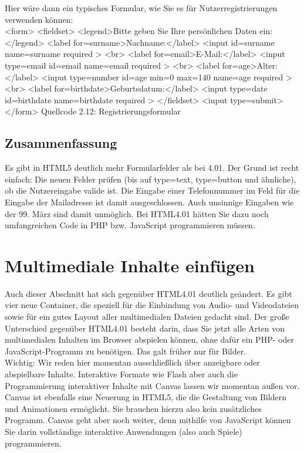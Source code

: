 Hier wäre dann ein typisches Formular, wie Sie es für Nutzerregistrierungen verwenden können:\\

<form>
<fieldset>
<legend>Bitte geben Sie Ihre persönlichen Daten ein:</legend>
<label for=surname>Nachname:</label>
<input id=surname name=surname required >
<br>
<label for=email>E-Mail:</label>
<input type=email id=email name=email required >
<br>
<label for=age>Alter:</label>
<input type=number id=age min=0 max=140 name=age required >
<br>
<label for=birthdate>Geburtsdatum:</label>
<input type=date id=birthdate name=birthdate required >
</fieldset>
<input type=submit>
</form>          
Quellcode 2.12: Registrierungsformular

\subsection{Zusammenfassung}

Es gibt in HTML5 deutlich mehr Formularfelder als bei 4.01. Der Grund ist recht einfach: Die neuen Felder prüfen (bis auf type=text, type=button und ähnliche), ob die Nutzereingabe valide ist. Die Eingabe einer Telefonnummer im Feld für die Eingabe der Mailadresse ist damit ausgeschlossen. Auch unsinnige Eingaben wie der 99. März sind damit unmöglich. Bei HTML4.01 hätten Sie dazu noch umfangreichen Code in PHP bzw. JavaScript programmieren müssen.

\section{Multimediale Inhalte einfügen}

Auch dieser Abschnitt hat sich gegenüber HTML4.01 deutlich geändert. Es gibt vier neue Container, die speziell für die Einbindung von Audio- und Videodateien sowie für ein gutes Layout aller multimedialen Dateien gedacht sind. Der große Unterschied gegenüber HTML4.01 besteht darin, dass Sie jetzt alle Arten von multimedialen Inhalten im Browser abspielen können, ohne dafür ein PHP- oder JavaScript-Programm zu benötigen. Das galt früher nur für Bilder.\\

Wichtig: Wir reden hier momentan ausschließlich über anzeigbare oder abspielbare Inhalte. Interaktive Formate wie Flash aber auch die Programmierung interaktiver Inhalte mit Canvas lassen wir momentan außen vor. Canvas ist ebenfalls eine Neuerung in HTML5, die die Gestaltung von Bildern und Animationen ermöglicht. Sie brauchen hierzu also kein zusätzliches Programm. Canvas geht aber noch weiter, denn mithilfe von JavaScript können Sie darin vollständige interaktive Anwendungen (also auch Spiele) programmieren.

